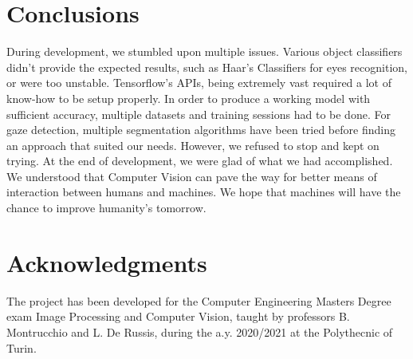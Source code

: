 \documentclass[a4paper, 12pt]{article}
\begin{document}
\section{Conclusions}
\label{Conclusions}
During development, we stumbled upon multiple issues.
Various object classifiers didn't provide the expected results, such as Haar’s Classifiers for eyes recognition, or were too unstable.
Tensorflow's APIs, being extremely vast required a lot of know-how to be setup properly. In order to produce a working model with sufficient accuracy, multiple datasets and training sessions had to be done.
For gaze detection, multiple segmentation algorithms have been tried before finding an approach that suited our needs.\linebreak
However, we refused to stop and kept on trying.
At the end of development, we were glad of what we had accomplished. We understood that Computer Vision can pave the way for better means of interaction between humans and machines.\linebreak
We hope that machines will have the chance to improve humanity's tomorrow.

\onecolumn
\section{Acknowledgments}
\label{Acks}
The project has been developed for the Computer Engineering Masters Degree exam Image Processing and Computer Vision, taught by professors B. Montrucchio and L. De Russis, during the a.y. 2020/2021 at the Polythecnic of Turin.
\end{document}
